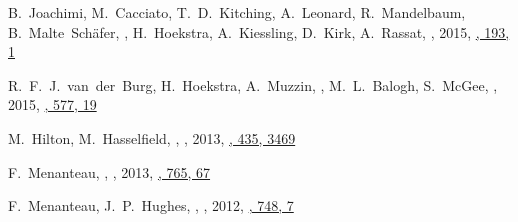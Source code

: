 \item
B.~Joachimi, M.~Cacciato, T.~D.~Kitching, A.~Leonard, R.~Mandelbaum, B.~Malte~Sch\"afer, \myself, H.~Hoekstra, A.~Kiessling, D.~Kirk, A.~Rassat,
,
2015, \href{http://adsabs.harvard.edu/doi/10.1007/s11214-015-0177-4}{\ssr, 193, 1}

\item
R.~F.~J.~van~der~Burg, H.~Hoekstra, A.~Muzzin, \myself, M.~L.~Balogh, S.~McGee,
,
2015, \href{http://adsabs.harvard.edu/abs/2015A&A...577A..19V}{\aap, 577, 19}

\item
M.~Hilton, M.~Hasselfield, \myself, 
,
2013, \href{https://ui.adsabs.harvard.edu/#abs/2013MNRAS.435.3469H/abstract}{\mnras, 435, 3469}

\item
F.~Menanteau, \myself, 
,
2013, \href{https://ui.adsabs.harvard.edu/#abs/2013ApJ...765...67M/abstract}{\apj, 765, 67}

\item
F.~Menanteau, J.~P.~Hughes, \myself, 
,
2012, \href{https://ui.adsabs.harvard.edu/#abs/2012ApJ...748....7M/abstract}{\apj, 748, 7}


